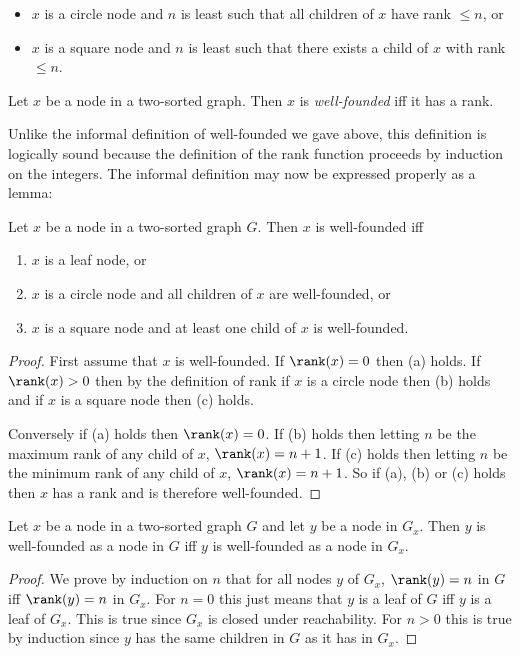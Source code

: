 \documentclass[oneside,12pt]{amsart}
\begin{document}
\begin{itemize}
\item $x$ is a circle node and $n$ is least such that all children of $x$ have rank $\leq n$, or
\item $x$ is a square node and $n$ is least such that there exists a child of $x$ with rank $\leq n$.
\end{itemize}

\begin{definition}
Let $x$ be a node in a two-sorted graph. Then $x$ is \emph{well-founded} iff it has a rank.
\end{definition}

Unlike the informal definition of well-founded we gave above, this definition is logically sound because
the definition of the rank function proceeds by induction on the integers. The informal definition may now
be expressed properly as a lemma:

\begin{lemma}
\label{SimpleDefOfWF}
Let $x$ be a node in a two-sorted graph $G$.  Then $x$ is well-founded iff
\begin{enumerate}
\item $x$ is a leaf node, or
\item $x$ is a circle node and all children of $x$ are well-founded, or
\item $x$ is a square node and at least one child of $x$ is well-founded.
\end{enumerate}
\end{lemma}
\begin{proof}
First assume that $x$ is well-founded. If $\rank(x) = 0$ then (a) holds.
If $\rank(x) > 0$ then by the definition of rank if $x$ is a circle node then (b)
holds and if $x$ is a square node then (c) holds.

Conversely if (a) holds then $\rank(x) = 0$. If (b) holds then letting $n$ be
the maximum rank of any child of $x$, $\rank(x) = n+1$. If (c) holds then letting
$n$ be the minimum rank of any child of $x$, $\rank(x) = n+1$. So if (a), (b) or (c)
holds then $x$ has a rank and is therefore well-founded.
\end{proof}

\begin{lemma}
\label{WellFoundedIsLocal}
Let $x$ be a node in a two-sorted graph $G$ and let $y$ be a node in $G_x$.
Then $y$ is well-founded as a node in $G$
iff $y$ is well-founded as a node in $G_x$.
\end{lemma}
\begin{proof}
We prove by induction on $n$ that for all nodes $y$ of $G_x$, $\rank(y) = n$  in $G$
iff $\rank(y) = n$  in $G_x$. For $n=0$ this just means that $y$ is a leaf of $G$ iff
$y$ is a leaf of $G_x$. This is true since $G_x$ is closed under reachability. For
$n>0$ this is true by induction since $y$ has the same children in $G$ as it has
in $G_x$.
\end{proof}
\end{document}
